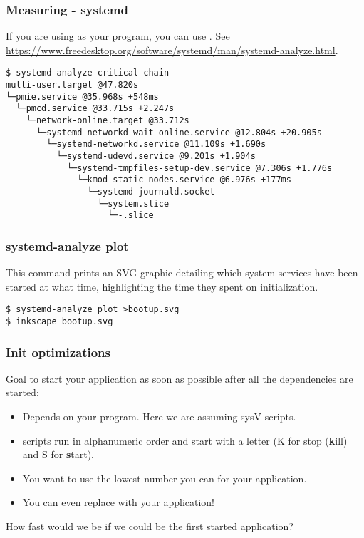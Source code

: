 \begin{frame}[fragile]
\frametitle{Measuring - systemd}
If you are using  as your  program, you can use
. See
\url{https://www.freedesktop.org/software/systemd/man/systemd-analyze.html}.\\
\begin{block}{}
\tiny
\begin{verbatim}
$ systemd-analyze critical-chain
multi-user.target @47.820s
└─pmie.service @35.968s +548ms
  └─pmcd.service @33.715s +2.247s
    └─network-online.target @33.712s
      └─systemd-networkd-wait-online.service @12.804s +20.905s
        └─systemd-networkd.service @11.109s +1.690s
          └─systemd-udevd.service @9.201s +1.904s
            └─systemd-tmpfiles-setup-dev.service @7.306s +1.776s
              └─kmod-static-nodes.service @6.976s +177ms
                └─systemd-journald.socket
                  └─system.slice
                    └─-.slice
\end{verbatim}
\end{block}
\end{frame}

\begin{frame}[fragile]
\frametitle{systemd-analyze plot}
This command prints an SVG graphic detailing which system services have been started at what time,
highlighting the time they spent on initialization.
\begin{verbatim}
$ systemd-analyze plot >bootup.svg
$ inkscape bootup.svg
\end{verbatim}
\end{frame}


\begin{frame}
\frametitle{Init optimizations}
Goal to start your application as soon as possible after all the dependencies are started:
\begin{itemize}
	\item Depends on your  program. Here we are assuming sysV
	       scripts.
	\item {} scripts run in alphanumeric order and start with
	      a letter (K for stop ({\bf k}ill) and S for {\bf s}tart).
	\item You want to use the lowest number you can for your application.
	\item You can even replace  with your application!
\end{itemize}
How fast would we be if we could be the first started application?
\end{frame}

